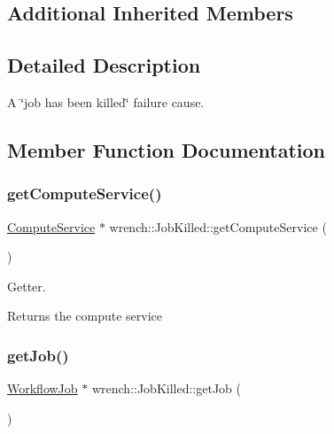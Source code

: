 \subsection*{Additional Inherited Members}


\subsection{Detailed Description}
A \char`\"{}job has been killed\char`\"{} failure cause. 

\subsection{Member Function Documentation}
\mbox{\label{classwrench_1_1_job_killed_a448c858885b28a03399103494ad85e5b}} 
\subsubsection{\texorpdfstring{get\+Compute\+Service()}{getComputeService()}}
{\footnotesize\ttfamily \hyperlink{classwrench_1_1_compute_service}{Compute\+Service} $\ast$ wrench\+::\+Job\+Killed\+::get\+Compute\+Service (\begin{DoxyParamCaption}{ }\end{DoxyParamCaption})}



Getter. 

\begin{DoxyReturn}{Returns}
the compute service 
\end{DoxyReturn}
\mbox{\label{classwrench_1_1_job_killed_a12b56e54f07217a9b0a3f3f67b001132}} 
\subsubsection{\texorpdfstring{get\+Job()}{getJob()}}
{\footnotesize\ttfamily \hyperlink{classwrench_1_1_workflow_job}{Workflow\+Job} $\ast$ wrench\+::\+Job\+Killed\+::get\+Job (\begin{DoxyParamCaption}{ }\end{DoxyParamCaption})}



